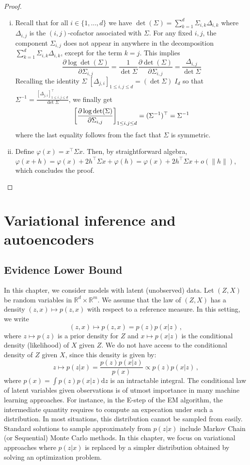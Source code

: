 \documentclass[english,graybox,envcountchap,envcountsame,sectrefs,shortlabels]{svmono}
\theoremstyle{style}
\begin{document}
\begin{proof}
  \begin{enumerate}[(i)]
    \item Recall that for all $i \in \{1,\ldots,d\}$ we have
      $\det(\Sigma)=\sum_{k=1}^d \Sigma_{i,k} \Delta_{i,k}$ where
      $\Delta_{i,j}$ is the $(i,j)$-cofactor associated with
      $\Sigma$. For any fixed $i,j$, the component $\Sigma_{i,j}$ does not appear in anywhere in
      the decomposition $\sum_{k=1}^d \Sigma_{i,k} \Delta_{i,k}$,
      except for the term $k=j$. This implies
      $$
      \frac{\partial \log \det(\Sigma)}{\partial \Sigma_{i,j}}=
      \frac{1}{\det \Sigma}\frac{\partial  \det(\Sigma)}{\partial
        \Sigma_{i,j}}=\frac{\Delta_{i,j}}{\det  \Sigma}
      $$
      Recalling the identity $\Sigma\; [\Delta_{j,i}]_{1\leq i,j \leq d}=(\det
      \Sigma)\; I_d$ so that $\Sigma^{-1}=\frac{[\Delta_{j,i}]_{1\leq i,j \leq d}^\top}{\det
      \Sigma}$, we finally get
      $$
\left[\frac{\partial \log \det(\Sigma)}{\partial \Sigma_{i,j}}\right]_{1\leq
  i,j  \leq d}=(\Sigma^{-1})^\top=\Sigma^{-1}
$$
where the last equality follows from the fact that $\Sigma$ is
symmetric.
\item Define $\varphi(x)=x^\top\Sigma x$. Then, by straightforward
  algebra, $\varphi(x+h)=\varphi(x)+2h^\top\Sigma
  x+\varphi(h)=\varphi(x)+2h^\top\Sigma x+o(\|h\|)$, which concludes the
  proof.
  \end{enumerate}
\end{proof}

\chapter{Variational inference and autoencoders}


\section{Evidence Lower Bound}
In this chapter, we consider models with latent (unobserved) data. Let $(Z,X)$ be random variables in $\mathbb{R}^d\times \mathbb{R}^m$. We assume that the law of $(Z,X)$ has a density $(z,x)\mapsto p(z,x)$ with respect to a reference measure. In this setting, we write
$$
(z,x)\mapsto p(z,x) = p(z)p(x|z)\,,
$$
where $z\mapsto p(z)$ is a prior density for $Z$ and $x \mapsto p(x|z)$ is the conditional density (likelihood) of $X$ given $Z$. We do not have access to the conditional density of $Z$ given $X$, since this density is given by:
$$
z\mapsto p(z|x) = \frac{p(z)p(x|z)}{p(x)}\propto p(z)p(x|z)\,, 
$$
where $p(x) = \int p(z)p(x|z) \mathrm{d} z$ is an intractable integral. The conditional law of latent variables given observations is of utmost importance in many machine learning approaches. For instance, in the E-step of the EM algorithm, the intermediate quantity requires to compute an expecation under such a distribution. In most situations, this distribution cannot be sampled from easily. Standard solutions to sample approximately from $p(z|x)$ include Markov Chain (or Sequential) Monte Carlo methods. In this chapter, we focus on variational approaches where $p(z|x)$ is replaced by a simpler distribution obtained by solving an optimization problem. 
\end{document}
